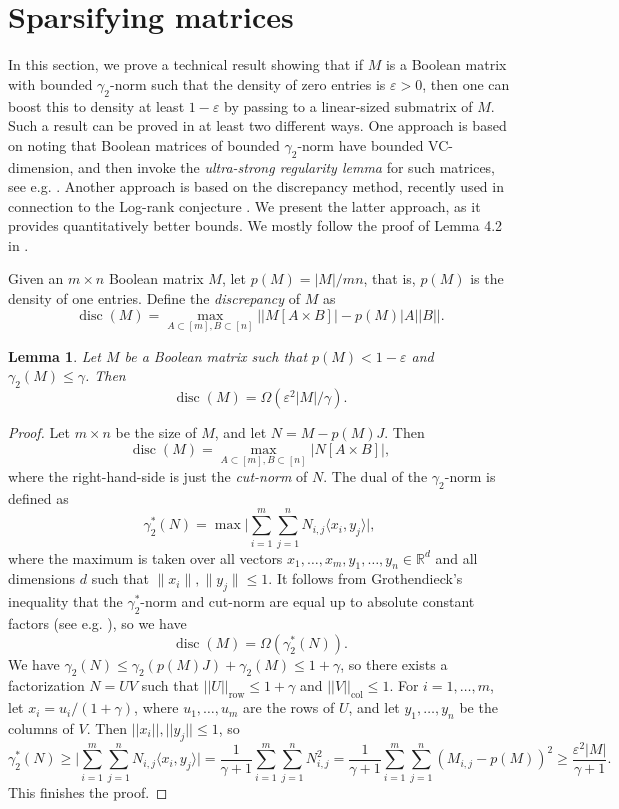 \documentclass[11pt]{amsart}
\theoremstyle{plain}
\newtheorem{lemma}[theorem]{Lemma}
\theoremstyle{definition}
\DeclareMathOperator{\row}{row}
\DeclareMathOperator{\col}{col}
\DeclareMathOperator{\disc}{disc}
\begin{document}
\section{Sparsifying matrices}\label{sect:sparsifying}

In this section, we prove a technical result showing that if $M$ is a Boolean matrix with bounded $\gamma_2$-norm such that the density of zero entries is $\varepsilon>0$, then one can boost this to density at least $1-\varepsilon$ by passing to a linear-sized submatrix of $M$. Such a result can be proved in at least two different ways. One approach is based on noting that Boolean matrices of bounded $\gamma_2$-norm have bounded VC-dimension, and then invoke the \emph{ultra-strong regularity lemma} for such matrices, see e.g. \cite{FPS19}. Another approach is based on the discrepancy method, recently used in connection to the Log-rank conjecture \cite{HMST,L16,ST24}. We present the latter approach, as it provides quantitatively better bounds. We mostly follow the proof of Lemma 4.2 in \cite{HMST}.

Given an $m\times n$ Boolean matrix $M$, let $p(M)=|M|/mn$, that is, $p(M)$ is the density of one entries. Define the \emph{discrepancy} of $M$ as
$$\disc(M)=\max_{A\subset [m], B\subset [n]} \big||M[A\times B]|-p(M)|A||B|\big|.$$

\begin{lemma}\label{lemma:disc}
Let $M$ be a Boolean matrix such that $p(M)<1-\varepsilon$ and $\gamma_2(M)\leq \gamma$. Then
$$\disc(M)=\Omega(\varepsilon^2 |M|/\gamma).$$
\end{lemma}

\begin{proof}
Let $m\times n$ be the size of $M$, and let $N=M-p(M)J$. Then $$\disc(M)=\max_{A\subset [m], B\subset [n]} |N[A\times B]|,$$ where the right-hand-side is just the  \emph{cut-norm} of $N$. The dual of the $\gamma_2$-norm is defined as $$\gamma_2^*(N)=\max \Big|\sum_{i=1}^{m}\sum_{j=1}^n N_{i,j}\langle x_i,y_j\rangle\Big|,$$
where the maximum is taken over all vectors $x_1, \dots, x_m, y_1, \dots, y_n\in \mathbb{R}^{d}$ and all dimensions $d$ such that $\|x_i\|, \|y_j\|\leq 1$. It follows from Grothendieck's inequality that the $\gamma_2^*$-norm and cut-norm are equal up to absolute constant factors (see e.g. \cite{LS}), so we have
$$\disc(M)=\Omega(\gamma_2^*(N)).$$
We have $\gamma_2(N)\leq \gamma_2(p(M)J)+\gamma_2(M)\leq 1+\gamma$, so there exists a factorization $N=UV$ such that $||U||_{\row}\leq 1+\gamma$ and $||V||_{\col}\leq 1$. For $i=1,\dots,m$, let $x_i=u_i/(1+\gamma)$, where $u_1,\dots,u_m$ are the rows of $U$, and let $y_1,\dots,y_n$ be the columns of $V$. Then $||x_i||,||y_j||\leq 1$, so
$$\gamma_2^{*}(N)\geq \Big|\sum_{i=1}^{m}\sum_{j=1}^n N_{i,j}\langle x_i,y_j\rangle\Big|=\frac{1}{\gamma+1}\sum_{i=1}^m\sum_{j=1}^n N_{i,j}^2=\frac{1}{\gamma+1}\sum_{i=1}^m\sum_{j=1}^n (M_{i,j}-p(M))^2\geq \frac{\varepsilon^2|M|}{\gamma+1}.$$
This finishes the proof.
\end{proof}
\end{document}
